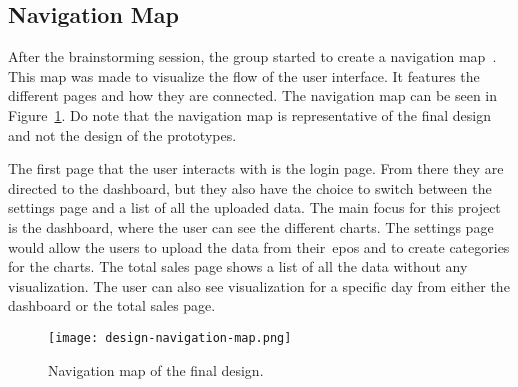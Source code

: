 \subsection{Navigation Map}\label{subsec:navigation-map}

After the brainstorming session, the group started to create a navigation map~\cite{benyon2019}.
This map was made to visualize the flow of the user interface.
It features the different pages and how they are connected.
The navigation map can be seen in Figure~\ref{fig:navigation-map}.
Do note that the navigation map is representative of the final design and not the design of the prototypes.

The first page that the user interacts with is the login page.
From there they are directed to the dashboard, but they also have the choice to switch between the settings page and a
list of all the uploaded data.
The main focus for this project is the dashboard, where the user can see the different charts.
The settings page would allow the users to upload the data from their~\acrshort{epos} and to create categories for the
charts.
The total sales page shows a list of all the data without any visualization.
The user can also see visualization for a specific day from either the dashboard or the total sales page.

\begin{figure}[H]
    \centering
    \texttt{[image: design-navigation-map.png]}
    \caption{Navigation map of the final design.
    }\label{fig:navigation-map}
\end{figure}
